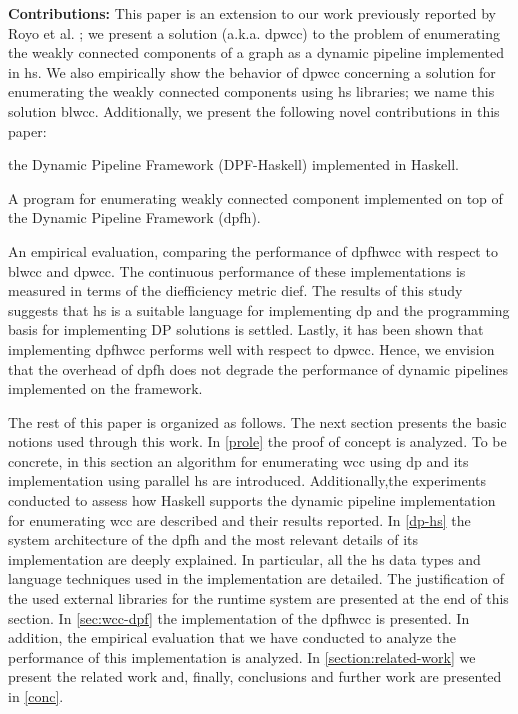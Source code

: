 \textbf{Contributions:} 
This paper is an extension to our work previously reported by Royo et al. \cite{prole}; we present a solution (a.k.a. \acrshort{dpwcc}) to the problem of enumerating the weakly connected components of a graph as a dynamic pipeline implemented in \acrshort{hs}. We also empirically show the behavior of \acrshort{dpwcc} concerning a solution for enumerating the weakly connected components using \acrshort{hs} libraries; we name this solution \acrfull{blwcc}. 
Additionally,  we present the following novel contributions in this paper:
\begin{inparaenum}[i\upshape)]
\item the Dynamic Pipeline Framework (DPF-Haskell) implemented in Haskell. 
\item A program for enumerating weakly connected component implemented on top of the Dynamic Pipeline Framework (\acrshort{dpfh}).
\item An empirical evaluation, comparing the performance of 
\acrfull{dpfhwcc} with respect to \acrshort{blwcc} and \acrfull{dpwcc}. 
The continuous  performance of these implementations is measured in terms of the diefficiency metric dief\@t \cite{diefpy}. The results of this study suggests that  \acrshort{hs} is a suitable language for implementing \acrshort{dp} and the programming basis for implementing DP solutions is settled. Lastly, it has been shown that implementing \acrshort{dpfhwcc} performs well with respect to \acrshort{dpwcc}. 
Hence, we envision that the overhead of \acrshort{dpfh} does not degrade the performance of dynamic pipelines implemented on the framework. 
\end{inparaenum}

The rest of this paper is organized as follows. 
The next section  presents  the basic notions used through this work. 
In \autoref{prole}  the proof of concept is analyzed. To be concrete, in this section an algorithm for enumerating \acrshort{wcc} using \acrshort{dp} and its implementation using parallel \acrshort{hs} are introduced. Additionally,the experiments conducted to assess how  Haskell supports the dynamic pipeline implementation for enumerating \acrshort{wcc} are described and their results reported. 
In \autoref{dp-hs} the system architecture of the \acrlong{dpfh} and the most relevant details of its implementation are deeply explained. In particular, all the \acrshort{hs} data types and language techniques used in the implementation are detailed. 
The justification of the used  external libraries for the runtime system are presented at the end of this section. In \autoref{sec:wcc-dpf} the implementation of the \acrshort{dpfhwcc} is presented. In addition, the empirical evaluation that we have conducted to analyze the performance of this implementation is analyzed. 
In \autoref{section:related-work} we present the related work and, finally, conclusions and further work are presented in  \autoref{conc}. 

